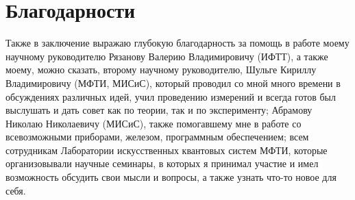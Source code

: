 \documentclass[12pt, twoside]{report}
\numberwithin{equation}{section}
\numberwithin{figure}{section}
\begin{document}
\section{Благодарности}

Также в заключение выражаю глубокую благодарность за помощь в работе моему научному руководителю Рязанову Валерию Владимировичу (ИФТТ), а также моему, можно сказать, второму научному руководителю, Шульге Кириллу Владимировичу (МФТИ, МИСиС), который проводил со мной много времени в обсуждениях различных идей, учил проведению измерений и всегда готов был выслушать и дать совет как по теории, так и по эксперименту; Абрамову Николаю Николаевичу (МИСиС), также помогавшему мне в работе со всевозможными приборами, железом, программным обеспечением; всем сотрудникам Лаборатории искусственных квантовых систем МФТИ, которые организовывали научные семинары, в которых я принимал участие и имел возможность обсудить свои мысли и вопросы, а также узнать что-то новое для себя.

\hypersetup{hidelinks=true}




\end{document}
